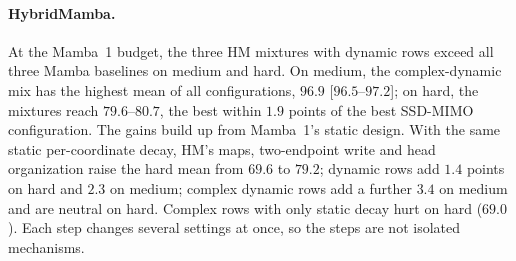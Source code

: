\paragraph{HybridMamba.}
At the Mamba~1 budget, the three HM mixtures with dynamic rows exceed all three Mamba baselines on medium and hard. On medium, the complex-dynamic mix has the highest mean of all configurations, $96.9$ [$96.5$--$97.2$]; on hard, the mixtures reach $79.6$--$80.7$, the best within $1.9$ points of the best SSD-MIMO configuration.
The gains build up from Mamba~1’s static design. With the same static per-coordinate decay, HM's maps, two-endpoint write and head organization raise the hard mean from $69.6$ to $79.2$; dynamic rows add $1.4$ points on hard and $2.3$ on medium; complex dynamic rows add a further $3.4$ on medium and are neutral on hard. Complex rows with only static decay hurt on hard ($69.0$). Each step changes several settings at once, so the steps are not isolated mechanisms.
